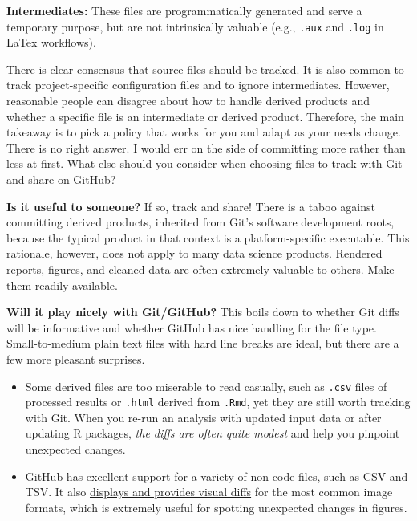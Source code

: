 \documentclass[12pt]{article}
\providecommand{\tightlist}{%
  \setlength{\itemsep}{0pt}\setlength{\parskip}{0pt}}
\begin{document}
\textbf{Intermediates:} These files are programmatically generated and
serve a temporary purpose, but are not intrinsically valuable (e.g.,
\texttt{.aux} and \texttt{.log} in LaTex workflows).

There is clear consensus that source files should be tracked. It is also
common to track project-specific configuration files and to ignore
intermediates. However, reasonable people can disagree about how to
handle derived products and whether a specific file is an intermediate
or derived product. Therefore, the main takeaway is to pick a policy
that works for you and adapt as your needs change. There is no right
answer. I would err on the side of committing more rather than less at
first. What else should you consider when choosing files to track with
Git and share on GitHub?

\textbf{Is it useful to someone?} If so, track and share! There is a
taboo against committing derived products, inherited from Git's software
development roots, because the typical product in that context is a
platform-specific executable. This rationale, however, does not apply to
many data science products. Rendered reports, figures, and cleaned data
are often extremely valuable to others. Make them readily available.

\textbf{Will it play nicely with Git/GitHub?} This boils down to whether
Git diffs will be informative and whether GitHub has nice handling for
the file type. Small-to-medium plain text files with hard line breaks
are ideal, but there are a few more pleasant surprises.

\begin{itemize}
\tightlist
\item
  Some derived files are too miserable to read casually, such as
  \texttt{.csv} files of processed results or \texttt{.html} derived
  from \texttt{.Rmd}, yet they are still worth tracking with Git. When
  you re-run an analysis with updated input data or after updating R
  packages, \emph{the diffs are often quite modest} and help you
  pinpoint unexpected changes.
\item
  GitHub has excellent
  \href{https://help.github.com/categories/working-with-non-code-files/}{support
  for a variety of non-code files}, such as CSV and TSV. It also
  \href{https://help.github.com/articles/rendering-and-diffing-images/}{displays
  and provides visual diffs} for the most common image formats, which is
  extremely useful for spotting unexpected changes in figures.
\end{itemize}
\end{document}
